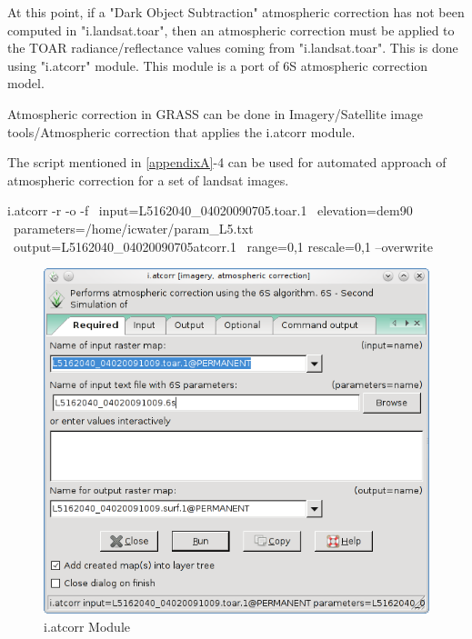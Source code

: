At this point, if a "Dark Object Subtraction" atmospheric correction has not been computed in "i.landsat.toar", then an atmospheric correction must be applied to the TOAR radiance/reflectance values coming from "i.landsat.toar". This is done using "i.atcorr" module. This module is a port of 6S atmospheric correction model.\newline

Atmospheric correction in GRASS can be done in Imagery/Satellite image tools/Atmospheric correction that applies the i.atcorr module.\newline

The script mentioned in \ref{appendixA}-4 can be used for automated approach of atmospheric correction for a set of  landsat images.\newline

\begin{smallverbatim}
i.atcorr -r -o -f \
 input=L5162040_04020090705.toar.1 \
 elevation=dem90 \
 parameters=/home/icwater/param_L5.txt \
 output=L5162040_04020090705atcorr.1 \
 range=0,1 rescale=0,1 --overwrite
\end{smallverbatim}

\begin{figure}[htbp]
   \centering
   \includegraphics[scale=0.4]{gipe016.png}
   \caption{i.atcorr Module}
   \label{fig:gipe016}
\end{figure}

